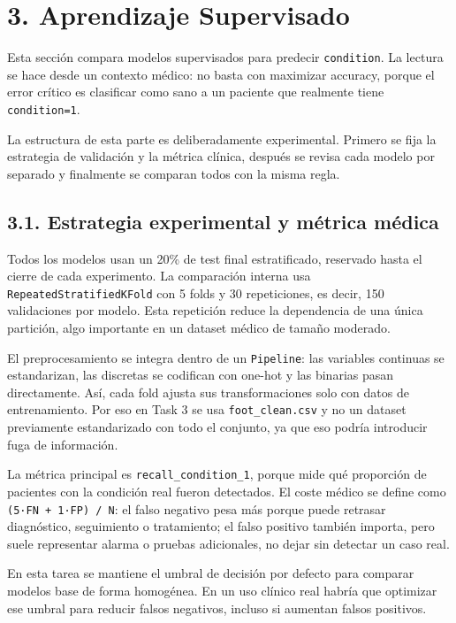 \documentclass[11pt]{article}
\begin{document}
    \section{3. Aprendizaje Supervisado}\label{aprendizaje-supervisado}

Esta sección compara modelos supervisados para predecir
\texttt{condition}. La lectura se hace desde un contexto médico: no
basta con maximizar accuracy, porque el error crítico es clasificar como
sano a un paciente que realmente tiene \texttt{condition=1}.

La estructura de esta parte es deliberadamente experimental. Primero se
fija la estrategia de validación y la métrica clínica, después se revisa
cada modelo por separado y finalmente se comparan todos con la misma
regla.

    \subsection{3.1. Estrategia experimental y métrica
médica}\label{estrategia-experimental-y-muxe9trica-muxe9dica}

Todos los modelos usan un 20\% de test final estratificado, reservado
hasta el cierre de cada experimento. La comparación interna usa
\texttt{RepeatedStratifiedKFold} con 5 folds y 30 repeticiones, es
decir, 150 validaciones por modelo. Esta repetición reduce la
dependencia de una única partición, algo importante en un dataset médico
de tamaño moderado.

El preprocesamiento se integra dentro de un \texttt{Pipeline}: las
variables continuas se estandarizan, las discretas se codifican con
one-hot y las binarias pasan directamente. Así, cada fold ajusta sus
transformaciones solo con datos de entrenamiento. Por eso en Task 3 se
usa \texttt{foot\_clean.csv} y no un dataset previamente estandarizado
con todo el conjunto, ya que eso podría introducir fuga de información.

La métrica principal es \texttt{recall\_condition\_1}, porque mide qué
proporción de pacientes con la condición real fueron detectados. El
coste médico se define como \texttt{(5·FN\ +\ 1·FP)\ /\ N}: el falso
negativo pesa más porque puede retrasar diagnóstico, seguimiento o
tratamiento; el falso positivo también importa, pero suele representar
alarma o pruebas adicionales, no dejar sin detectar un caso real.

En esta tarea se mantiene el umbral de decisión por defecto para
comparar modelos base de forma homogénea. En un uso clínico real habría
que optimizar ese umbral para reducir falsos negativos, incluso si
aumentan falsos positivos.
\end{document}
